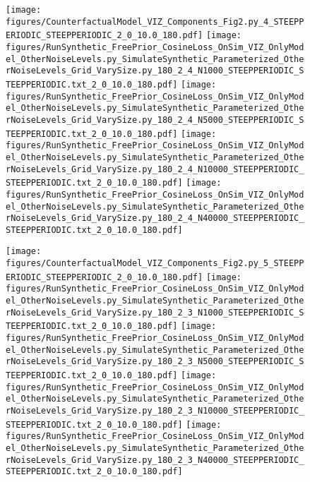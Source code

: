 \documentclass{article}
\begin{document}
\begin{figure}
\texttt{[image: figures/CounterfactualModel\_VIZ\_Components\_Fig2.py\_4\_STEEPPERIODIC\_STEEPPERIODIC\_2\_0\_10.0\_180.pdf]}
\texttt{[image: figures/RunSynthetic\_FreePrior\_CosineLoss\_OnSim\_VIZ\_OnlyModel\_OtherNoiseLevels.py\_SimulateSynthetic\_Parameterized\_OtherNoiseLevels\_Grid\_VarySize.py\_180\_2\_4\_N1000\_STEEPPERIODIC\_STEEPPERIODIC.txt\_2\_0\_10.0\_180.pdf]}
\texttt{[image: figures/RunSynthetic\_FreePrior\_CosineLoss\_OnSim\_VIZ\_OnlyModel\_OtherNoiseLevels.py\_SimulateSynthetic\_Parameterized\_OtherNoiseLevels\_Grid\_VarySize.py\_180\_2\_4\_N5000\_STEEPPERIODIC\_STEEPPERIODIC.txt\_2\_0\_10.0\_180.pdf]}
\texttt{[image: figures/RunSynthetic\_FreePrior\_CosineLoss\_OnSim\_VIZ\_OnlyModel\_OtherNoiseLevels.py\_SimulateSynthetic\_Parameterized\_OtherNoiseLevels\_Grid\_VarySize.py\_180\_2\_4\_N10000\_STEEPPERIODIC\_STEEPPERIODIC.txt\_2\_0\_10.0\_180.pdf]}
\texttt{[image: figures/RunSynthetic\_FreePrior\_CosineLoss\_OnSim\_VIZ\_OnlyModel\_OtherNoiseLevels.py\_SimulateSynthetic\_Parameterized\_OtherNoiseLevels\_Grid\_VarySize.py\_180\_2\_4\_N40000\_STEEPPERIODIC\_STEEPPERIODIC.txt\_2\_0\_10.0\_180.pdf]}


\texttt{[image: figures/CounterfactualModel\_VIZ\_Components\_Fig2.py\_5\_STEEPPERIODIC\_STEEPPERIODIC\_2\_0\_10.0\_180.pdf]}
\texttt{[image: figures/RunSynthetic\_FreePrior\_CosineLoss\_OnSim\_VIZ\_OnlyModel\_OtherNoiseLevels.py\_SimulateSynthetic\_Parameterized\_OtherNoiseLevels\_Grid\_VarySize.py\_180\_2\_3\_N1000\_STEEPPERIODIC\_STEEPPERIODIC.txt\_2\_0\_10.0\_180.pdf]}
\texttt{[image: figures/RunSynthetic\_FreePrior\_CosineLoss\_OnSim\_VIZ\_OnlyModel\_OtherNoiseLevels.py\_SimulateSynthetic\_Parameterized\_OtherNoiseLevels\_Grid\_VarySize.py\_180\_2\_3\_N5000\_STEEPPERIODIC\_STEEPPERIODIC.txt\_2\_0\_10.0\_180.pdf]}
\texttt{[image: figures/RunSynthetic\_FreePrior\_CosineLoss\_OnSim\_VIZ\_OnlyModel\_OtherNoiseLevels.py\_SimulateSynthetic\_Parameterized\_OtherNoiseLevels\_Grid\_VarySize.py\_180\_2\_3\_N10000\_STEEPPERIODIC\_STEEPPERIODIC.txt\_2\_0\_10.0\_180.pdf]}
\texttt{[image: figures/RunSynthetic\_FreePrior\_CosineLoss\_OnSim\_VIZ\_OnlyModel\_OtherNoiseLevels.py\_SimulateSynthetic\_Parameterized\_OtherNoiseLevels\_Grid\_VarySize.py\_180\_2\_3\_N40000\_STEEPPERIODIC\_STEEPPERIODIC.txt\_2\_0\_10.0\_180.pdf]}



\end{figure}
\end{document}
